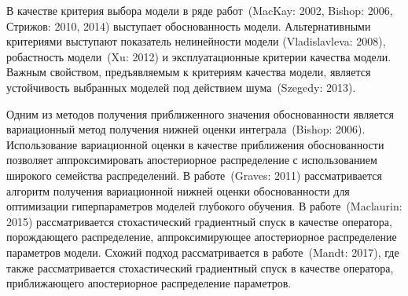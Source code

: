 \documentclass[11pt, a5paper]{dissert}
\theoremstyle{definition}
\begin{document}
В качестве критерия выбора модели в ряде работ~(MacKay: 2002, Bishop: 2006, Стрижов: 2010, 2014) выступает обоснованность модели. %
Альтернативными критериями выступают показатель нелинейности модели (Vladislavleva: 2008), робастность модели~(Xu: 2012) и эксплуатационные критерии качества модели. Важным свойством, предъявляемым к критериям качества модели, является устойчивость выбранных моделей под действием шума~(Szegedy: 2013). 

Одним из методов получения приближенного значения обоснованности является вариационный метод получения нижней оценки интеграла~(Bishop: 2006). Использование вариационной оценки в качестве приближения обоснованности позволяет аппроксимировать апостериорное распределение с использованием широкого семейства распределений.  В работе~(Graves: 2011) рассматривается алгоритм получения вариационной нижней оценки обоснованности  для оптимизации гиперпараметров моделей глубокого обучения. В работе~(Maclaurin: 2015) рассматривается стохастический градиентный спуск в качестве оператора, порождающего распределение, аппроксимирующее апостериорное распределение параметров модели. Схожий подход рассматривается в работе~(Mandt: 2017), где также рассматривается стохастический градиентный спуск в качестве оператора, приближающего апостериорное распределение параметров. %

\end{document}
